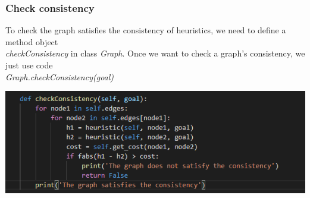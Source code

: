 \documentclass[aps,letterpaper,10pt]{revtex4}
\begin{document}
\subsubsection{Check consistency}
To check the graph satisfies the consistency of heuristics, we need to define a method object \\
\emph{checkConsistency} in class \emph{Graph}.
Once we want to check a graph's consistency, we just use code\\ \emph{Graph.checkConsistency(goal)}\\
\centerline{\includegraphics[scale=0.8]{Check.png}}\\
\end{document}
